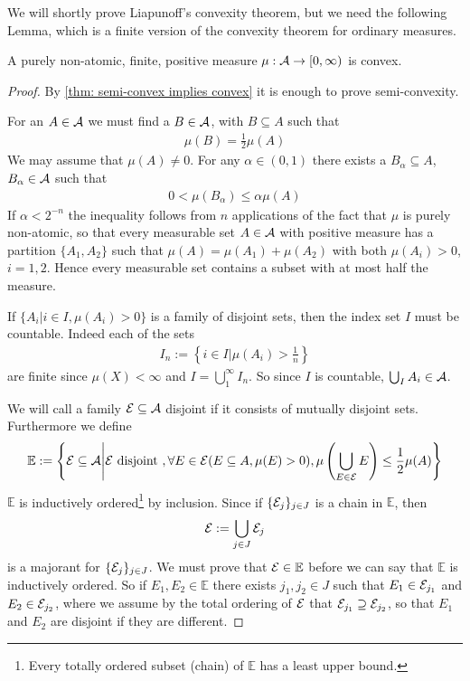 We will shortly prove Liapunoff's convexity theorem, but we need the following Lemma, which is a finite version of the convexity theorem for ordinary measures.

\begin{lemma}\label{lem: finite liapunoff}
A purely non-atomic, finite, positive measure $\mu:\mathcal{A}\to [0,\infty)$ is convex.
\end{lemma}
\begin{proof}
By \cref{thm: semi-convex implies convex} it is enough to prove semi-convexity.

For an $A\in \mathcal{A}$ we must find a $B\in \mathcal{A}$, with $B\subseteq A$ such that
\begin{align*}
	\mu(B)=\frac{1}{2}\mu(A)
\end{align*}
We may assume that $\mu(A)\neq 0$. For any $\alpha\in (0,1)$ there exists a $B_{\alpha}\subseteq A$, $B_{\alpha}\in \mathcal{A}$ such that
\begin{align}
	0< \mu(B_{\alpha}) \le \alpha\mu(A) \label{eq: B alpha}
\end{align}
If $\alpha< 2^{-n}$ the inequality follows from $n$ applications of the fact that $\mu$ is purely non-atomic, so that every measurable set $A\in \mathcal{A}$ with positive measure has a partition $\{A_{1}, A_{2}\}$ such that $\mu(A)=\mu(A_{1})+\mu(A_{2})$ with both $\mu(A_{i})>0$, $i=1,2$. Hence every measurable set contains a subset with at most half the measure.

If $\{A_{i}|i\in I, \mu(A_{i})>0\}$ is a family of disjoint sets, then the index set $I$ must be countable. Indeed each of the sets
\begin{align*}
	I_{n}:=\left\{i\in I | \mu(A_{i}) > \frac{1}{n} \right\}
\end{align*}
are finite since $\mu(X)<\infty$ and $I=\bigcup_{1}^{\infty}I_{n}$. So since $I$ is countable, $\bigcup_{I}A_{i}\in \mathcal{A}$.

We will call a family $\mathcal{E}\subseteq \mathcal{A}$ disjoint if it consists of mutually disjoint sets. Furthermore we define
\begin{align*}
	\mathbb{E}:=\left\{ \mathcal{E}\subseteq \mathcal{A} \middle| \mathcal{E} \text{ disjoint }, \forall E\in \mathcal{E} (E\subseteq A, \mu(E)>0), \mu\left( \bigcup_{E\in \mathcal{E}} E\right) \le \frac{1}{2}\mu(A) \right\}
\end{align*}
$\mathbb{E}$ is inductively ordered\footnote{Every totally ordered subset (chain) of $\mathbb{E}$ has a least upper bound.} by inclusion. Since if $\{\mathcal{E}_{j}\}_{j\in J}$ is a chain in $\mathbb{E}$, then
\begin{align*}
	\mathcal{E}:=\bigcup_{j\in J}\mathcal{E}_{j}
\end{align*}
is a majorant for $\{\mathcal{E}_{j}\}_{j\in J}$. We must prove that $\mathcal{E}\in \mathbb{E}$ before we can say that $\mathbb{E}$ is inductively ordered. So if $E_{1},E_{2}\in \mathbb{E}$ there exists $j_{1},j_{2}\in J$ such that $E_{1}\in \mathcal{E}_{j_{1}}$ and $E_{2}\in \mathcal{E}_{j_{2}}$, where we assume by the total ordering of $\mathcal{E}$ that $\mathcal{E}_{j_{1}} \supseteq \mathcal{E}_{j_{2}}$, so that $E_{1}$ and $E_{2}$ are disjoint if they are different.


\end{proof}
